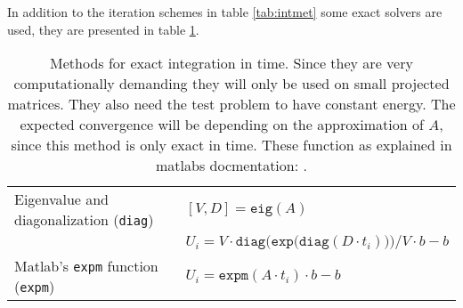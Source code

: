 In addition to the iteration schemes in table \ref{tab:intmet} some exact solvers are used, they are presented in table \ref{tab:intcorrect}.
\begin{table}
\begin{tabular}{l l}
Eigenvalue and diagonalization (\texttt{diag}) & $[V,D] = \texttt{eig}(A)$ \\
 & $U_i = V \cdot \texttt{diag} \Big( \texttt{exp} \big( \texttt{diag}(D \cdot t_i)\big)\Big)/V \cdot b - b$ \\
Matlab's \texttt{expm} function (\texttt{expm}) & $U_i = \texttt{expm}(A \cdot t_i) \cdot b - b$ \\

\end{tabular}
\caption{Methods for exact integration in time. Since they are very computationally demanding they will only be used on small projected matrices. They also need the test problem to have constant energy. The expected convergence will be depending on the approximation of $A$, since this method is only exact in time. These function as explained in matlabs docmentation: \cite{expm}. }
\label{tab:intcorrect} 
\end{table}

